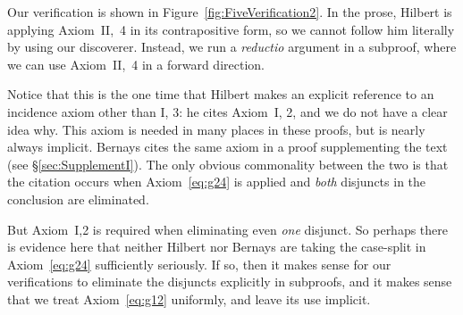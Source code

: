 Our verification is shown in Figure~\ref{fig:FiveVerification2}. In the prose, Hilbert is applying Axiom~II,~4 in its contrapositive form, so we cannot follow him literally by using our  discoverer. Instead, we run a \emph{reductio} argument in a subproof, where we can use Axiom~II,~4 in a forward direction.

\label{sec:g12Erratic}Notice that this is the one time that Hilbert makes an explicit reference to an incidence axiom other than I, 3: he cites Axiom~I, 2, and we do not have a clear idea why. This axiom is needed in many places in these proofs, but is nearly always implicit. Bernays cites the same axiom in a proof supplementing the text (see \S\ref{sec:SupplementI}). The only obvious commonality between the two is that the citation occurs when Axiom~\ref{eq:g24} is applied and \emph{both} disjuncts in the conclusion are eliminated. 

But Axiom~I,2 is required when eliminating even \emph{one} disjunct. So perhaps there is evidence here that neither Hilbert nor Bernays are taking the case-split in Axiom~\ref{eq:g24} sufficiently seriously. If so, then it makes sense for our verifications to eliminate the disjuncts explicitly in subproofs, and it makes sense that we treat Axiom~\ref{eq:g12} uniformly, and leave its use implicit.

